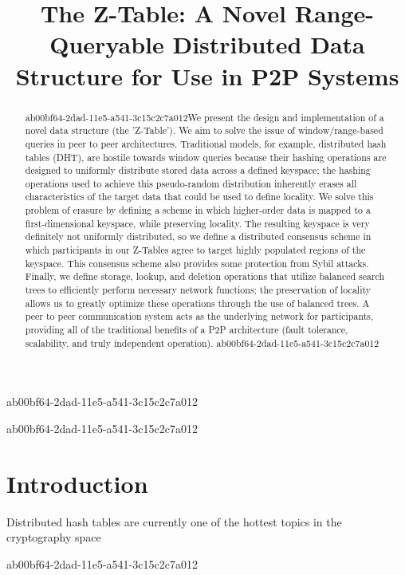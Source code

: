 \documentclass[12pt]{article}
\title{The Z-Table: A Novel Range-Queryable Distributed Data Structure for Use in P2P Systems}
\begin{document}
ab00bf64-2dad-11e5-a541-3c15c2c7a012\maketitle

\begin{abstract}
ab00bf64-2dad-11e5-a541-3c15c2c7a012We present the design and implementation of a novel data structure (the 'Z-Table'). We aim to solve the issue of window/range-based queries in peer to peer architectures. Traditional models, for example,  distributed hash tables (DHT), are hostile towards window queries because their hashing operations are designed to uniformly distribute stored data across a defined keyspace; the hashing operations used to achieve this pseudo-random distribution inherently erases all characteristics of the target data that could be used to define locality. We solve this problem of erasure by defining a scheme in which higher-order data is mapped to a first-dimensional keyspace, while preserving locality. The resulting keyspace is very definitely not uniformly distributed, so we define a distributed consensus scheme in which participants in our Z-Tables agree to target highly populated regions of the keyspace. This consensus scheme also provides some protection from Sybil attacks. Finally, we define storage, lookup, and deletion operations that utilize balanced search trees to efficiently perform necessary network functions; the preservation of locality allows us to greatly optimize these operations through the use of balanced trees. A peer to peer communication system acts as the underlying network for participants, providing all of the traditional benefits of a P2P architecture (fault tolerance, scalability, and truly independent operation).
ab00bf64-2dad-11e5-a541-3c15c2c7a012\end{abstract}


\newpage
ab00bf64-2dad-11e5-a541-3c15c2c7a012\section{Introduction}
Distributed hash tables are currently one of the hottest topics in the cryptography space~\cite{Stoica:2001dj,Rowstron:2001ea,Ratnasamy:2001wn}

ab00bf64-2dad-11e5-a541-3c15c2c7a012\printbibliography
\end{document}
